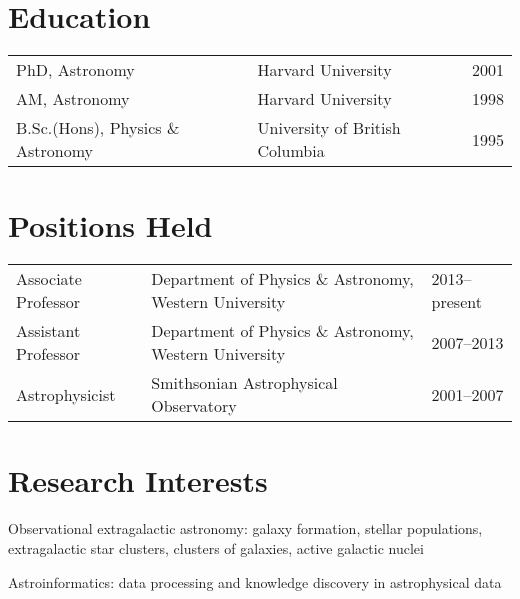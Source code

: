 \documentclass[12pt]{article}
\begin{document}
\maketitle

\section{Education}
\begin{tabular}{lll}
PhD, Astronomy & Harvard University & 2001\\
AM, Astronomy & Harvard University & 1998\\
B.Sc.(Hons),  Physics \& Astronomy & University of British Columbia&1995\\
\end{tabular}

\section{Positions Held} 

\begin{tabular}{lll}
Associate Professor & Department of Physics \& Astronomy, Western University & 2013--present \\
Assistant Professor& Department of Physics \& Astronomy, Western University&2007--2013  \\
 Astrophysicist & Smithsonian Astrophysical Observatory & 2001--2007\\
\end{tabular}


\section{Research Interests}

Observational extragalactic astronomy: galaxy formation, stellar populations, 
extragalactic star clusters, clusters of galaxies, active galactic nuclei

Astroinformatics: data processing and knowledge discovery in astrophysical data
\end{document}
